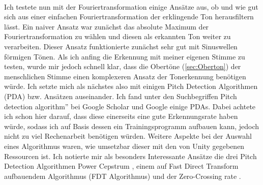 \\ %
Ich testete nun mit der Fouriertransformation einige Ansätze aus, ob und wie gut sich aus einer einfachen Fouriertransformation der erklingende Ton herausfiltern lässt. Ein naiver Ansatz war zunächst das absolute Maximum der Fouriertransformation zu wählen und diesen als erkannten Ton weiter zu verarbeiten. Dieser Ansatz funktionierte zunächst sehr gut mit Sinuswellen förmigen Tönen. Als ich anfing die Erkennung mit meiner eigenen Stimme zu testen, wurde mir jedoch schnell klar, dass die Obertöne (\ref{sec:Oberton}) der menschlichen Stimme einen komplexeren Ansatz der Tonerkennung benötigen würde. Ich setzte mich als nächstes also mit einigen Pitch Detection Algorithmen (PDA) bzw. Ansätzen auseinander. Ich fand unter den Suchbegriffen \glqq Pitch detection algorithm'' bei Google Scholar und Google einige PDAs. Dabei achtete ich schon hier darauf, dass diese einerseits eine gute Erkennungsrate haben würde, sodass ich auf Basis dessen ein Trainingsprogramm aufbauen kann, jedoch nicht zu viel Rechenarbeit benötigen würden. Weitere Aspekte bei der Auswahl eines Algorithmus waren, wie umsetzbar dieser mit den von Unity gegebenen Ressourcen ist. Ich notierte mir als besonders Interessante Ansätze die drei Pitch Detection Algorithmen Power Cepstrum \cite{norton2003fundamentals}, einem auf Fast Direct Transform aufbauendem Algorithmus (FDT Algorithmus) \cite{yazama2005simple} und der Zero-Crossing rate \cite{amado2008pitch}. 


